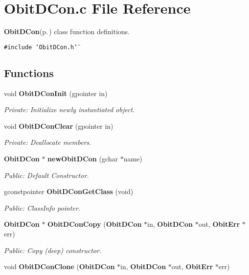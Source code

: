 \section{Obit\-DCon.c File Reference}
\label{ObitDCon_8c}
{\bf Obit\-DCon}{\rm (p.\,\pageref{structObitDCon})} class function definitions. 

{\tt \#include \char`\"{}Obit\-DCon.h\char`\"{}}\par
\subsection*{Functions}
\begin{CompactItemize}
\item 
void {\bf Obit\-DCon\-Init} (gpointer in)
\begin{CompactList}\small\item\em Private: Initialize newly instantiated object. \item\end{CompactList}\item 
void {\bf Obit\-DCon\-Clear} (gpointer in)
\begin{CompactList}\small\item\em Private: Deallocate members. \item\end{CompactList}\item 
{\bf Obit\-DCon} $\ast$ {\bf new\-Obit\-DCon} (gchar $\ast$name)
\begin{CompactList}\small\item\em Public: Default Constructor. \item\end{CompactList}\item 
gconstpointer {\bf Obit\-DCon\-Get\-Class} (void)
\begin{CompactList}\small\item\em Public: Class\-Info pointer. \item\end{CompactList}\item 
{\bf Obit\-DCon} $\ast$ {\bf Obit\-DCon\-Copy} ({\bf Obit\-DCon} $\ast$in, {\bf Obit\-DCon} $\ast$out, {\bf Obit\-Err} $\ast$err)
\begin{CompactList}\small\item\em Public: Copy (deep) constructor. \item\end{CompactList}\item 
void {\bf Obit\-DCon\-Clone} ({\bf Obit\-DCon} $\ast$in, {\bf Obit\-DCon} $\ast$out, {\bf Obit\-Err} $\ast$err)

\end{CompactItemize}
